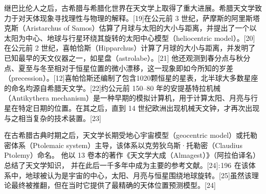 继巴比伦人之后，古希腊与希腊化世界在天文学上取得了重大进展。希腊天文学致力于对天体现象寻找理性与物理的解释。[19]在公元前 3 世纪，萨摩斯的阿里斯塔克斯（Aristarchus of Samos）估算了月球与太阳的大小与距离，并提出了一个以太阳为中心、地球与行星环绕其旋转的太阳中心模型（heliocentric model）。[20]在公元前 2 世纪，喜帕恰斯（Hipparchus）计算了月球的大小与距离，并发明了已知最早的天文仪器之一，如星盘（astrolabe）。[21]  
他还观测到春分点与秋分点、夏至与冬至相对于恒星位置的微小漂移，这一现象即如今所知的岁差（precession）。[12]喜帕恰斯还编制了包含1020颗恒星的星表，北半球大多数星座的命名均源自希腊天文学。[22]约公元前 150–80 年的安提基特拉机械（Antikythera mechanism）是一种早期的模拟计算机，用于计算太阳、月亮与行星在特定日期的位置。在其之后，直到 14 世纪欧洲出现机械天文钟，才再次出现与之相当复杂的技术装置。[23]  

在古希腊古典时期之后，天文学长期受地心宇宙模型（geocentric model）或托勒密体系（Ptolemaic system）主导，该体系以克劳狄乌斯·托勒密（Claudius Ptolemy）命名。  
他以 13 卷本的著作《天文学大成（Almagest）》（阿拉伯译名）总结了天文学知识，  
并在此后一千多年中成为主要的参考文献。[24]: 196  在该体系中，地球被认为是宇宙的中心，太阳、月亮与恒星围绕地球旋转。[25]虽然该理论最终被推翻，但在当时它提供了最精确的天体位置预测模型。[24]

